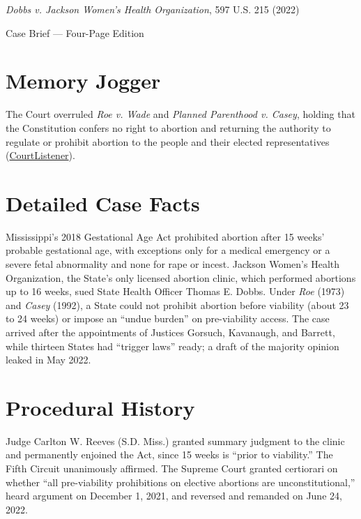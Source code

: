 \documentclass[12pt]{article}
\begin{document}
\begin{center}
{\LARGE \textit{Dobbs v. Jackson Women's Health Organization}, 597 U.S. 215 (2022)\par}
\vspace{0.8em}
{\large Case Brief --- Four-Page Edition\par}
\end{center}
\vspace{1em}

\section{Memory Jogger}

The Court overruled \textit{Roe v. Wade} and \textit{Planned Parenthood v. Casey}, holding that the Constitution confers no right to abortion and returning the authority to regulate or prohibit abortion to the people and their elected representatives (\href{https://www.courtlistener.com/opinion/6481357/dobbs-v-jackson-womens-health-organization/}{CourtListener}).

\section{Detailed Case Facts}

Mississippi's 2018 Gestational Age Act prohibited abortion after 15 weeks' probable gestational age, with exceptions only for a medical emergency or a severe fetal abnormality and none for rape or incest. Jackson Women's Health Organization, the State's only licensed abortion clinic, which performed abortions up to 16 weeks, sued State Health Officer Thomas E. Dobbs. Under \textit{Roe} (1973) and \textit{Casey} (1992), a State could not prohibit abortion before viability (about 23 to 24 weeks) or impose an ``undue burden'' on pre-viability access. The case arrived after the appointments of Justices Gorsuch, Kavanaugh, and Barrett, while thirteen States had ``trigger laws'' ready; a draft of the majority opinion leaked in May 2022.

\section{Procedural History}

Judge Carlton W. Reeves (S.D. Miss.) granted summary judgment to the clinic and permanently enjoined the Act, since 15 weeks is ``prior to viability.'' The Fifth Circuit unanimously affirmed. The Supreme Court granted certiorari on whether ``all pre-viability prohibitions on elective abortions are unconstitutional,'' heard argument on December 1, 2021, and reversed and remanded on June 24, 2022.
\end{document}
